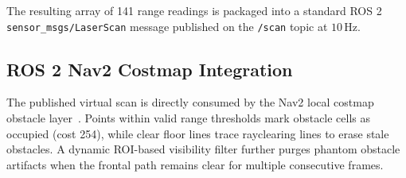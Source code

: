 The resulting array of 141 range readings is packaged into a standard ROS 2 \texttt{sensor\_msgs/LaserScan} message published on the \texttt{/scan} topic at $10\,\text{Hz}$.

\subsection{ROS 2 Nav2 Costmap Integration}
The published virtual scan is directly consumed by the Nav2 local costmap obstacle layer~\cite{macenski2020marathon}. Points within valid range thresholds mark obstacle cells as occupied (cost 254), while clear floor lines trace rayclearing lines to erase stale obstacles. A dynamic ROI-based visibility filter further purges phantom obstacle artifacts when the frontal path remains clear for multiple consecutive frames.
